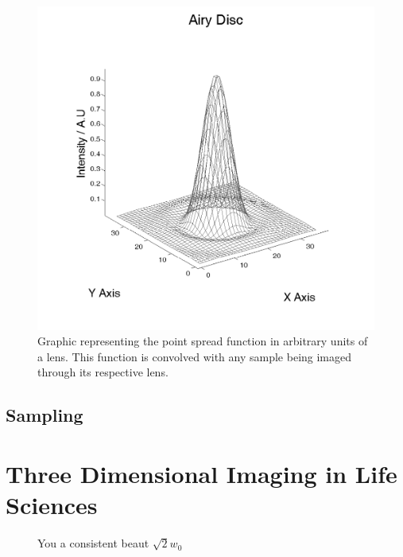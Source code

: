 \begin{figure}
	\centering
	\includegraphics[width=0.6\linewidth]{Airy_Disc}
	\caption[Airy Disc]{Graphic representing the point spread function in arbitrary units of a lens.
This function is convolved with any sample being imaged through its respective lens.}
	\label{fig:Airy_Disc}
\end{figure}

\subsection{Sampling}


%

\section{Three Dimensional Imaging in Life Sciences}


  \begin{figure}
  \centering
  \def\svgwidth{0.6\textwidth}
  
  \caption{You a consistent beaut \(\sqrt2 w_0\)}
  \end{figure}


